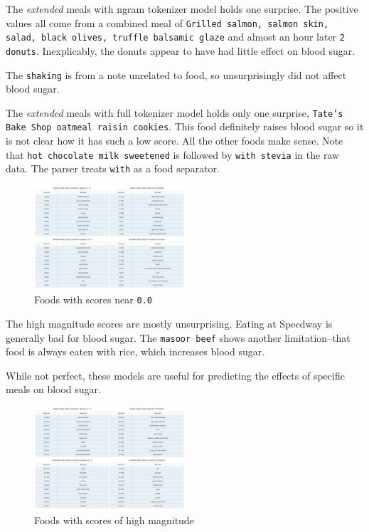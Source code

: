 \documentclass[conference]{IEEEtran}
\begin{document}
The \emph{extended} meals with ngram tokenizer model holds one surprise. The positive values all come from a combined meal of \texttt{Grilled salmon, salmon skin, salad, black olives, truffle balsamic glaze} and almost an hour later \texttt{2 donuts}. Inexplicably, the donuts appear to have had little effect on blood sugar.

The \texttt{shaking} is from a note unrelated to food, so unsurprisingly did not affect blood sugar.

The \emph{extended} meals with full tokenizer model holds only one surprise, \texttt{Tate's Bake Shop oatmeal raisin cookies}. This food definitely raises blood sugar so it is not clear how it has such a low score. All the other foods make sense. Note that \texttt{hot chocolate milk sweetened} is followed by \texttt{with stevia} in the raw data. The parser treats \texttt{with} as a food separator.

\begin{figure}[tbp]
    \includegraphics[width=0.5\textwidth]{images/low_gplus_best_models.png}
    \caption{Foods with scores near \texttt{0.0}}
    \label{fig:low_best}
\end{figure}

The high magnitude scores are mostly unsurprising. Eating at Speedway is generally bad for blood sugar. The \texttt{masoor beef} shows another limitation--that food is always eaten with rice, which increases blood sugar.

While not perfect, these models are useful for predicting the effects of specific meals on blood sugar.

\begin{figure}[tbp]
    \includegraphics[width=0.5\textwidth]{images/high_gplus_best_models.png}
    \caption{Foods with scores of high magnitude}
    \label{fig:high_best}
\end{figure}
\end{document}
